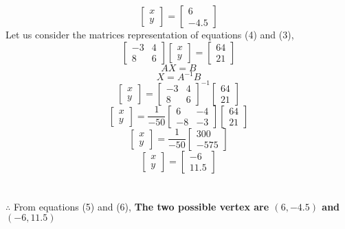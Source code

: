 \documentclass[journal,12pt,twocolumn]{IEEEtran}
\begin{document}
\begin{equation}
\begin{bmatrix}
x \\ y
\end{bmatrix}
=
\begin{bmatrix}
6 \\ -4.5
\end{bmatrix}
\end{equation}
\noindent
Let us consider the matrices representation of equations (4) and (3),
\[
\begin{bmatrix}
-3 & 4 \\
8 & 6 
\end{bmatrix}
\begin{bmatrix}
x \\ y
\end{bmatrix}
=
\begin{bmatrix}
64 \\ 21
\end{bmatrix}
\]
$$AX=B$$
$$X= A^{-1}B$$
\[
\begin{bmatrix}
x \\ y
\end{bmatrix}
=
\begin{bmatrix}
-3 & 4 \\
8 & 6 
\end{bmatrix}^{-1}
\begin{bmatrix}
64 \\ 21
\end{bmatrix}
\]
\[
\begin{bmatrix}
x \\ y
\end{bmatrix}
=
\frac{1}{-50}
\begin{bmatrix}
6 & -4 \\
-8 & -3 
\end{bmatrix}
\begin{bmatrix}
64 \\ 21
\end{bmatrix}
\]
\[
\begin{bmatrix}
x \\ y
\end{bmatrix}
=
\frac{1}{-50}
\begin{bmatrix}
300 \\ -575
\end{bmatrix}
\]
\begin{equation}
\begin{bmatrix}
x \\ y
\end{bmatrix}
=
\begin{bmatrix}
-6 \\ 11.5
\end{bmatrix}
\end{equation}
\\\\
\noindent
$\therefore$ From equations (5) and (6), \textbf{The two possible vertex are $(6,-4.5)$ and $(-6,11.5)$}
\end{document}
